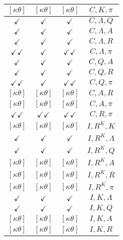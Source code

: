 \documentclass[a4paper,10pt]{article}
\begin{document}
\begin{longtable}{|c|c|c|c|}
\hline
$[\kappa \theta ]$ & $[\kappa \theta ]$ & $[\kappa \theta ]$ & ${C},{K},{\pi}$ \\
\hline
$\checkmark$ & $\checkmark$ & $\checkmark$ & ${C},{\Lambda},{Q}$ \\
\hline
$\checkmark$ & $\checkmark$ & $\checkmark$ & ${C},{\Lambda},{A}$ \\
\hline
$\checkmark$ & $\checkmark$ & $\checkmark$ & ${C},{\Lambda},{R}$ \\
\hline
$\checkmark\checkmark$ & $\checkmark$ & $\checkmark\checkmark$ & ${C},{\Lambda},{\pi}$ \\
\hline
$\checkmark$ & $\checkmark$ & $\checkmark$ & ${C},{Q},{A}$ \\
\hline
$\checkmark$ & $\checkmark$ & $\checkmark$ & ${C},{Q},{R}$ \\
\hline
$\checkmark\checkmark$ & $\checkmark$ & $\checkmark\checkmark$ & ${C},{Q},{\pi}$ \\
\hline
$[\kappa \theta ]$ & $[\kappa \theta ]$ & $[\kappa \theta ]$ & ${C},{A},{R}$ \\
\hline
$[\kappa \theta ]$ & $[\kappa \theta ]$ & $[\kappa \theta ]$ & ${C},{A},{\pi}$ \\
\hline
$\checkmark\checkmark$ & $\checkmark\checkmark$ & $\checkmark\checkmark$ & ${C},{R},{\pi}$ \\
\hline
$[\kappa \theta ]$ & $[\kappa \theta ]$ & $[\kappa \theta ]$ & ${I},{R^{K}},{K}$ \\
\hline
$\checkmark$ & $\checkmark$ & $\checkmark$ & ${I},{R^{K}},{\Lambda}$ \\
\hline
$\checkmark$ & $\checkmark$ & $\checkmark$ & ${I},{R^{K}},{Q}$ \\
\hline
$[\kappa \theta ]$ & $[\kappa \theta ]$ & $[\kappa \theta ]$ & ${I},{R^{K}},{A}$ \\
\hline
$[\kappa \theta ]$ & $[\kappa \theta ]$ & $[\kappa \theta ]$ & ${I},{R^{K}},{R}$ \\
\hline
$[\kappa \theta ]$ & $[\kappa \theta ]$ & $[\kappa \theta ]$ & ${I},{R^{K}},{\pi}$ \\
\hline
$\checkmark$ & $\checkmark$ & $\checkmark$ & ${I},{K},{\Lambda}$ \\
\hline
$\checkmark$ & $\checkmark$ & $\checkmark$ & ${I},{K},{Q}$ \\
\hline
$[\kappa \theta ]$ & $[\kappa \theta ]$ & $[\kappa \theta ]$ & ${I},{K},{A}$ \\
\hline
$[\kappa \theta ]$ & $[\kappa \theta ]$ & $[\kappa \theta ]$ & ${I},{K},{R}$ \\
\hline

\end{longtable}
\end{document}
